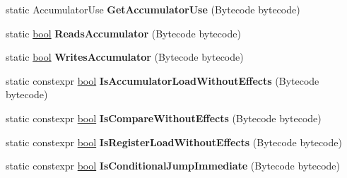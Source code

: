 \begin{DoxyCompactItemize}
\item 
\mbox{\label{classv8_1_1internal_1_1interpreter_1_1Bytecodes_a42e2c9524fbfafad0717db5311315953}} 
static Accumulator\+Use {\bfseries Get\+Accumulator\+Use} (Bytecode bytecode)
\item 
\mbox{\label{classv8_1_1internal_1_1interpreter_1_1Bytecodes_a710da4b4ced2ade57bcdf73a75a54ad6}} 
static \mbox{\hyperlink{classbool}{bool}} {\bfseries Reads\+Accumulator} (Bytecode bytecode)
\item 
\mbox{\label{classv8_1_1internal_1_1interpreter_1_1Bytecodes_a2b02417dc06cb85a2249d960cea98f37}} 
static \mbox{\hyperlink{classbool}{bool}} {\bfseries Writes\+Accumulator} (Bytecode bytecode)
\item 
\mbox{\label{classv8_1_1internal_1_1interpreter_1_1Bytecodes_a64a7aefe92e10acec6a40d8d45b81c3f}} 
static constexpr \mbox{\hyperlink{classbool}{bool}} {\bfseries Is\+Accumulator\+Load\+Without\+Effects} (Bytecode bytecode)
\item 
\mbox{\label{classv8_1_1internal_1_1interpreter_1_1Bytecodes_a0c5806f08544b46bb66dafbc6eeacde7}} 
static constexpr \mbox{\hyperlink{classbool}{bool}} {\bfseries Is\+Compare\+Without\+Effects} (Bytecode bytecode)
\item 
\mbox{\label{classv8_1_1internal_1_1interpreter_1_1Bytecodes_ac665bb9f30116375c03b76fd79cd5724}} 
static constexpr \mbox{\hyperlink{classbool}{bool}} {\bfseries Is\+Register\+Load\+Without\+Effects} (Bytecode bytecode)
\item 
\mbox{\label{classv8_1_1internal_1_1interpreter_1_1Bytecodes_a436ef582bc1a7d73b7bdb9235afa85be}} 
static constexpr \mbox{\hyperlink{classbool}{bool}} {\bfseries Is\+Conditional\+Jump\+Immediate} (Bytecode bytecode)
\item 
\mbox{\label{classv8_1_1internal_1_1interpreter_1_1Bytecodes_a2014a0fcd64dbba4cf662c02b439617c}} 

\end{DoxyCompactItemize}
